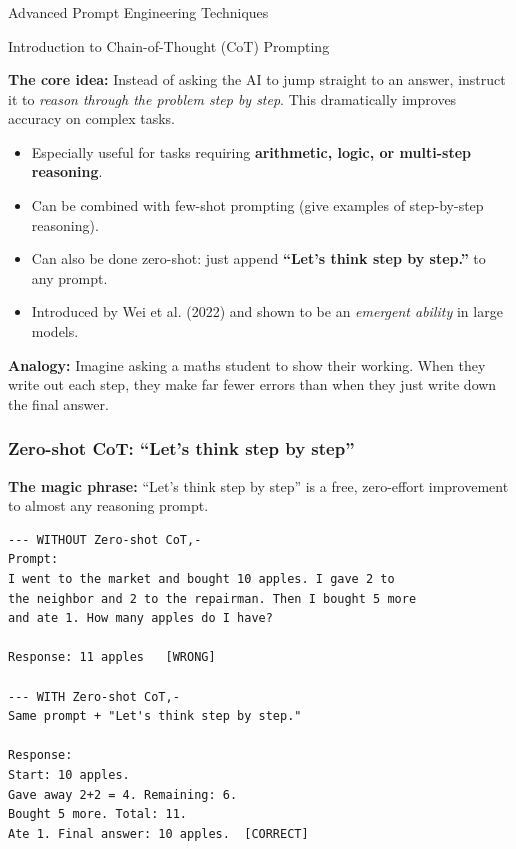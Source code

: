 \begin{frame}[fragile]\frametitle{}
\begin{center}
{\Large Advanced Prompt Engineering Techniques}
\end{center}
\end{frame}


\begin{frame}[fragile]{Introduction to Chain-of-Thought (CoT) Prompting}

\textbf{The core idea:} Instead of asking the AI to jump straight to an answer, instruct it to \emph{reason through the problem step by step}. This dramatically improves accuracy on complex tasks.

    \begin{itemize}
		\item Especially useful for tasks requiring \textbf{arithmetic, logic, or multi-step reasoning}.
		\item Can be combined with few-shot prompting (give examples of step-by-step reasoning).
		\item Can also be done zero-shot: just append \textbf{``Let's think step by step.''} to any prompt.
        \item Introduced by Wei et al. (2022) and shown to be an \emph{emergent ability} in large models.
    \end{itemize}

\medskip
\textbf{Analogy:} Imagine asking a maths student to show their working. When they write out each step, they make far fewer errors than when they just write down the final answer.

\end{frame}

\begin{frame}[fragile]\frametitle{Zero-shot CoT: ``Let's think step by step''}

\textbf{The magic phrase:} ``Let's think step by step'' is a free, zero-effort improvement to almost any reasoning prompt.


\begin{lstlisting}[language=HTML]
--- WITHOUT Zero-shot CoT,-
Prompt: 
I went to the market and bought 10 apples. I gave 2 to 
the neighbor and 2 to the repairman. Then I bought 5 more 
and ate 1. How many apples do I have?

Response: 11 apples   [WRONG]

--- WITH Zero-shot CoT,-
Same prompt + "Let's think step by step."

Response:
Start: 10 apples.
Gave away 2+2 = 4. Remaining: 6.
Bought 5 more. Total: 11.
Ate 1. Final answer: 10 apples.  [CORRECT]
\end{lstlisting}


\end{frame}


